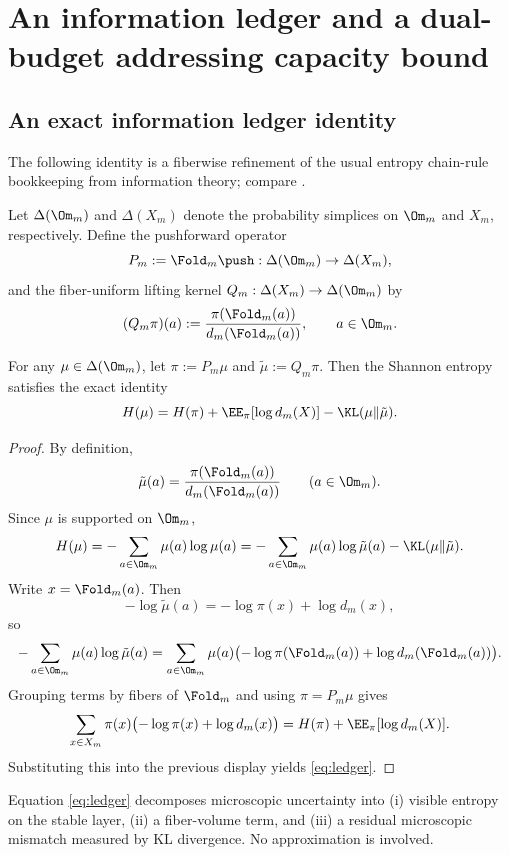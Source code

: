 \section{An information ledger and a dual-budget addressing capacity bound}
\label{sec:ledger}

\subsection{An exact information ledger identity}
The following identity is a fiberwise refinement of the usual entropy chain-rule bookkeeping from information theory; compare \cite[Chapter~2]{CoverThomas2006}.

Let \(\Delta(\Om_m)\) and \(\Delta(X_m)\) denote the probability simplices on \(\Om_m\) and \(X_m\), respectively. Define the pushforward operator
\[
P_m := \Fold_m\push : \Delta(\Om_m)\to \Delta(X_m),
\]
and the fiber-uniform lifting kernel \(Q_m:\Delta(X_m)\to \Delta(\Om_m)\) by
\begin{equation}\label{eq:Qm}
(Q_m \pi)(a) := \frac{\pi(\Fold_m(a))}{d_m(\Fold_m(a))},\qquad a\in \Om_m.
\end{equation}

\begin{theorem}\label{thm:ledger}
For any \(\mu\in \Delta(\Om_m)\), let \(\pi:=P_m\mu\) and \(\tilde \mu := Q_m\pi\). Then the Shannon entropy satisfies the exact identity
\begin{equation}\label{eq:ledger}
H(\mu)=H(\pi)+\EE_{\pi}[\log d_m(X)]-\KL(\mu\|\tilde \mu).
\end{equation}
\end{theorem}

\begin{proof}
By definition,
\[
\tilde\mu(a)=\frac{\pi(\Fold_m(a))}{d_m(\Fold_m(a))}\qquad (a\in\Om_m).
\]
Since \(\mu\) is supported on \(\Om_m\),
\[
H(\mu)
=
-\sum_{a\in\Om_m}\mu(a)\log \mu(a)
=
-\sum_{a\in\Om_m}\mu(a)\log \tilde\mu(a)-\KL(\mu\|\tilde\mu).
\]
Write \(x=\Fold_m(a)\). Then
\[
-\log \tilde\mu(a)
=
-\log \pi(x)+\log d_m(x),
\]
so
\[
-\sum_{a\in\Om_m}\mu(a)\log \tilde\mu(a)
=
\sum_{a\in\Om_m}\mu(a)\bigl(-\log \pi(\Fold_m(a))+\log d_m(\Fold_m(a))\bigr).
\]
Grouping terms by fibers of \(\Fold_m\) and using \(\pi=P_m\mu\) gives
\[
\sum_{x\in X_m}\pi(x)\bigl(-\log \pi(x)+\log d_m(x)\bigr)
=
H(\pi)+\EE_\pi[\log d_m(X)].
\]
Substituting this into the previous display yields \eqref{eq:ledger}.
\end{proof}

\begin{remark}
Equation \eqref{eq:ledger} decomposes microscopic uncertainty into (i) visible entropy on the stable layer, (ii) a fiber-volume term, and (iii) a residual microscopic mismatch measured by KL divergence. No approximation is involved.
\end{remark}

